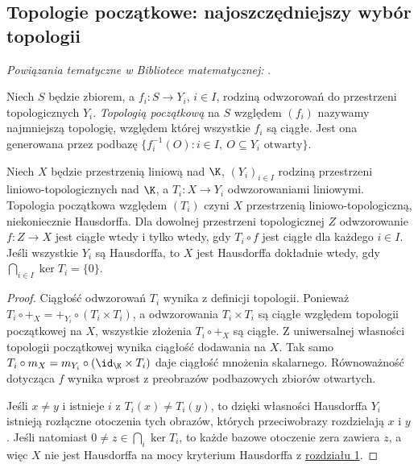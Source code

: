 \subsection{Topologie początkowe: najoszczędniejszy wybór topologii}

\noindent\emph{Powiązania tematyczne w Bibliotece matematycznej:} .


\begin{definicja}
Niech $S$ będzie zbiorem, a $f_i:S\to Y_i$, $i\in I$,
rodziną odwzorowań do przestrzeni topologicznych $Y_i$.
\emph{Topologią początkową} na $S$ względem $(f_i)$
nazywamy najmniejszą topologię, względem której wszystkie
$f_i$ są ciągłe. Jest ona generowana przez podbazę
$\{f_i^{-1}(O):i\in I,\ O\subseteq Y_i\text{ otwarty}\}$.
\end{definicja}

\begin{twierdzenie}\label{thm:initial-tvs}
Niech $X$ będzie przestrzenią liniową nad $\K$, $(Y_i)_{i\in I}$
rodziną przestrzeni liniowo-topologicznych nad $\K$,
a $T_i:X\to Y_i$ odwzorowaniami liniowymi.
Topologia początkowa względem $(T_i)$ czyni $X$
przestrzenią liniowo-topologiczną, niekoniecznie Hausdorffa.
Dla dowolnej przestrzeni topologicznej $Z$ odwzorowanie
$f:Z\to X$ jest ciągłe wtedy i tylko wtedy, gdy
$T_i\circ f$ jest ciągłe dla każdego $i\in I$.
Jeśli wszystkie $Y_i$ są Hausdorffa, to $X$ jest Hausdorffa
dokładnie wtedy, gdy $\bigcap_{i\in I}\ker T_i=\{0\}$.
\end{twierdzenie}
\begin{proof}
Ciągłość odwzorowań $T_i$ wynika z definicji topologii.
Ponieważ $T_i\circ+_X=+_{Y_i}\circ(T_i\times T_i)$,
a odwzorowania $T_i\times T_i$ są ciągłe względem
topologii początkowej na $X$, wszystkie złożenia
$T_i\circ+_X$ są ciągłe. Z uniwersalnej własności
topologii początkowej wynika ciągłość dodawania na $X$.
Tak samo $T_i\circ m_X=m_{Y_i}\circ(\id_\K\times T_i)$
daje ciągłość mnożenia skalarnego. Równoważność dotycząca
$f$ wynika wprost z preobrazów podbazowych zbiorów otwartych.

Jeśli $x\ne y$ i istnieje $i$ z $T_i(x)\ne T_i(y)$,
to dzięki własności Hausdorffa $Y_i$ istnieją rozłączne
otoczenia tych obrazów, których przeciwobrazy rozdzielają
$x$ i $y$. Jeśli natomiast $0\ne z\in\bigcap_i\ker T_i$,
to każde bazowe otoczenie zera zawiera $z$, a więc
$X$ nie jest Hausdorffa na mocy kryterium Hausdorffa
z \hyperref[sec:tvs]{rozdziału 1}.
\end{proof}

